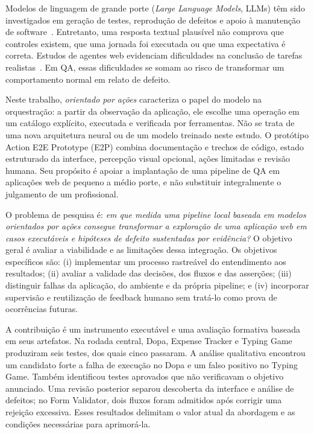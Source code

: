 \documentclass[12pt]{article}
\begin{document}
Modelos de linguagem de grande porte (\textit{Large Language Models}, LLMs) têm sido investigados em geração de testes, reprodução de defeitos e apoio à manutenção de software~\cite{wang2024survey,kang2023libro}. Entretanto, uma resposta textual plausível não comprova que controles existem, que uma jornada foi executada ou que uma expectativa é correta. Estudos de agentes web evidenciam dificuldades na conclusão de tarefas realistas~\cite{zhou2024webarena,drouin2024workarena}. Em QA, essas dificuldades se somam ao risco de transformar um comportamento normal em relato de defeito.

Neste trabalho, \textit{orientado por ações} caracteriza o papel do modelo na orquestração: a partir da observação da aplicação, ele escolhe uma operação em um catálogo explícito, executada e verificada por ferramentas. Não se trata de uma nova arquitetura neural ou de um modelo treinado neste estudo. O protótipo Action E2E Prototype (E2P) combina documentação e trechos de código, estado estruturado da interface, percepção visual opcional, ações limitadas e revisão humana. Seu propósito é apoiar a implantação de uma pipeline de QA em aplicações web de pequeno a médio porte, e não substituir integralmente o julgamento de um profissional.

O problema de pesquisa é: \textit{em que medida uma pipeline local baseada em modelos orientados por ações consegue transformar a exploração de uma aplicação web em casos executáveis e hipóteses de defeito sustentadas por evidência?} O objetivo geral é avaliar a viabilidade e as limitações dessa integração. Os objetivos específicos são: (i) implementar um processo rastreável do entendimento aos resultados; (ii) avaliar a validade das decisões, dos fluxos e das asserções; (iii) distinguir falhas da aplicação, do ambiente e da própria pipeline; e (iv) incorporar supervisão e reutilização de feedback humano sem tratá-lo como prova de ocorrências futuras.

A contribuição é um instrumento executável e uma avaliação formativa baseada em seus artefatos. Na rodada central, Dopa, Expense Tracker e Typing Game produziram seis testes, dos quais cinco passaram. A análise qualitativa encontrou um candidato forte a falha de execução no Dopa e um falso positivo no Typing Game. Também identificou testes aprovados que não verificavam o objetivo anunciado. Uma revisão posterior separou descoberta da interface e análise de defeitos; no Form Validator, dois fluxos foram admitidos após corrigir uma rejeição excessiva. Esses resultados delimitam o valor atual da abordagem e as condições necessárias para aprimorá-la.
\end{document}
